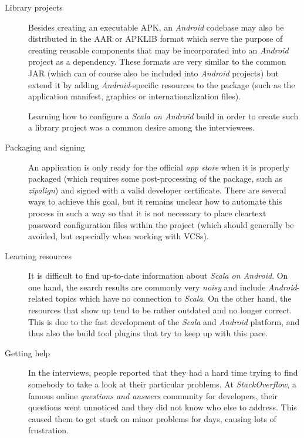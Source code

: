 \begin{description}
	\item[Library projects]\hfill

	Besides creating an executable \ac{APK}, an \textit{Android} codebase may also be distributed in the \ac{AAR} or \ac{APKLIB} format which serve the purpose of creating reusable components that may be incorporated into an \textit{Android} project as a dependency. These formats are very similar to the common \ac{JAR} (which can of course also be included into \textit{Android} projects) but extend it by adding \textit{Android}-specific resources to the package (such as the application manifest, graphics or internationalization files).

	Learning how to configure a \textit{Scala on Android} build in order to create such a library project was a common desire among the interviewees.

	\item[Packaging and signing]\hfill

	An application is only ready for the official \textit{app store} when it is properly packaged (which requires some post-processing of the package, such as \textit{zipalign}) and signed with a valid developer certificate. There are several ways to achieve this goal, but it remains unclear how to automate this process in such a way so that it is not necessary to place cleartext password configuration files within the project (which should generally be avoided, but especially when working with \acp{VCS}).

	\item[Learning resources]\hfill

	It is difficult to find up-to-date information about \textit{Scala on Android}. On one hand, the search results are commonly very \textit{noisy} and include \textit{Android}-related topics which have no connection to \textit{Scala}. On the other hand, the resources that show up tend to be rather outdated and no longer correct. This is due to the fast development of the \textit{Scala} and \textit{Android} platform, and thus also the build tool plugins that try to keep up with this pace.

	\item[Getting help]\hfill

	In the interviews, people reported that they had a hard time trying to find somebody to take a look at their particular problems. At \textit{StackOverflow}, a famous online \textit{questions and answers} community for developers, their questions went unnoticed and they did not know who else to address. This caused them to get stuck on minor problems for days, causing lots of frustration.

\end{description}

